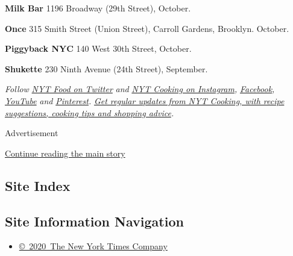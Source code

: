 \textbf{Milk Bar} 1196 Broadway (29th Street), October.

\textbf{Once} 315 Smith Street (Union Street), Carroll Gardens,
Brooklyn. October.

\textbf{Piggyback NYC} 140 West 30th Street, October.

\textbf{Shukette} 230 Ninth Avenue (24th Street), September.

\emph{Follow} \href{https://twitter.com/nytfood}{\emph{NYT Food on
Twitter}} \emph{and}
\href{https://www.instagram.com/nytcooking/}{\emph{NYT Cooking on
Instagram}}\emph{,}
\href{https://www.facebookcorewwwi.onion/nytcooking/}{\emph{Facebook}}\emph{,}
\href{https://www.youtube.com/nytcooking}{\emph{YouTube}} \emph{and}
\href{https://www.pinterest.com/nytcooking/}{\emph{Pinterest}}\emph{.}
\href{https://www.nytimes3xbfgragh.onion/newsletters/cooking}{\emph{Get
regular updates from NYT Cooking, with recipe suggestions, cooking tips
and shopping advice}}\emph{.}

Advertisement

\protect\hyperlink{after-bottom}{Continue reading the main story}

\hypertarget{site-index}{%
\subsection{Site Index}\label{site-index}}

\hypertarget{site-information-navigation}{%
\subsection{Site Information
Navigation}\label{site-information-navigation}}

\begin{itemize}
\tightlist
\item
  \href{https://help.nytimes3xbfgragh.onion/hc/en-us/articles/115014792127-Copyright-notice}{©~2020~The
  New York Times Company}
\end{itemize}

